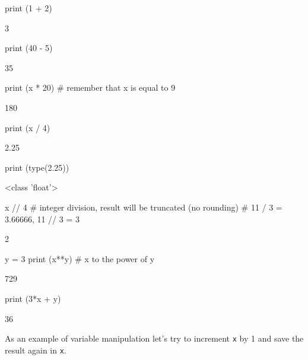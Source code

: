 \begin{ipythonnon}
print (1 + 2)	
\end{ipythonnon}
\begin{ioutput}
3
\end{ioutput}

\begin{ipythonnon}
print (40 - 5)	
\end{ipythonnon}
\begin{ioutput}
35
\end{ioutput}

\begin{ipythonnon}
print (x * 20) # remember that x is equal to 9
\end{ipythonnon}
\begin{ioutput}
180	
\end{ioutput}

\begin{ipythonnon}
print (x / 4)
\end{ipythonnon}
\begin{ioutput}
2.25
\end{ioutput}

\begin{ipythonnon}
print (type(2.25))
\end{ipythonnon}
\begin{ioutput}
<class 'float'>	
\end{ioutput}

\begin{ipythonnon}
x // 4 # integer division, result will be truncated (no rounding)
       # 11 / 3 = 3.66666, 11 // 3 = 3
\end{ipythonnon}
\begin{ioutput}
2
\end{ioutput}

\begin{ipythonnon}
y = 3
print (x**y) # x to the power of y 	
\end{ipythonnon}
\begin{ioutput}
729
\end{ioutput}

\begin{ipythonnon}
print (3*x + y)	
\end{ipythonnon}
\begin{ioutput}
36	
\end{ioutput}

As an example of variable manipulation let's try to increment \texttt{x} by 1 and save the result again in \texttt{x}.


